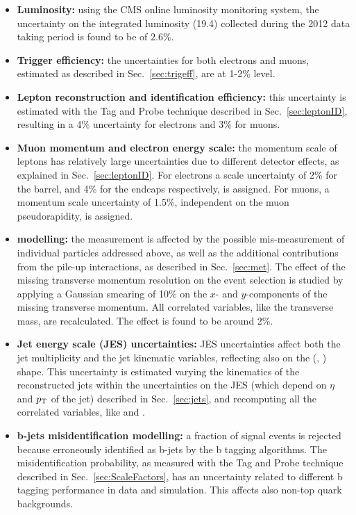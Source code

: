 \begin{itemize}
\item {\bf Luminosity:} using the CMS online luminosity monitoring system, the uncertainty on the integrated luminosity (19.4\ifb) collected during the 2012 data taking period is found to be of $2.6\%$.

\item {\bf Trigger efficiency:} the uncertainties for both electrons and muons, estimated as described in Sec.~\ref{sec:trigeff}, are at 1-2\% level.

\item {\bf Lepton reconstruction and identification efficiency:} 
this uncertainty is estimated with the Tag and Probe technique described in Sec.~\ref{sec:leptonID}, resulting in a 4\% uncertainty for electrons and 3\% for muons.

\item {\bf Muon momentum and electron energy scale:} 
the momentum scale of leptons has relatively large uncertainties due to different detector effects, as explained in Sec.~\ref{sec:leptonID}. For electrons a scale  uncertainty of 2\% for the barrel, and 4\% for the endcaps respectively, is assigned. For muons, a momentum scale uncertainty of 1.5\%, independent on the muon pseudorapidity, is assigned.

\item {\bf {\boldmath \MET} modelling:} 
  the \MET measurement is affected by the possible mis-measurement of 
  individual particles addressed above, as well as the additional contributions 
  from the pile-up interactions, as described in Sec.~\ref{sec:met}. 
  The effect of the missing transverse momentum resolution on the event selection
  is studied by applying a Gaussian smearing of 10\% on the $x$- and
  $y$-components of the missing transverse momentum. All correlated variables,
  like the transverse mass, are recalculated. The effect is found to be around 2\%.

\item {\bf Jet energy scale (JES) uncertainties:} 
  JES uncertainties affect both the jet multiplicity and the jet kinematic variables, reflecting also on the (\mll, \mt) shape.
  This uncertainty is estimated varying the kinematics of the reconstructed jets within the uncertainties on the JES (which depend on $\eta$ and $p_\mathrm{T}$ of the jet) described in Sec.~\ref{sec:jets}, and recomputing all the correlated variables, like \mll and \mt.

\item {\bf b-jets misidentification modelling:}
a fraction of signal events is rejected because erroneously identified as b-jets by the b tagging algorithms. The misidentification probability, as measured with the Tag and Probe technique described in Sec.~\ref{sec:ScaleFactors}, has an uncertainty related to different b tagging performance in data and simulation. This affects also non-top quark backgrounds.
          

\end{itemize}
